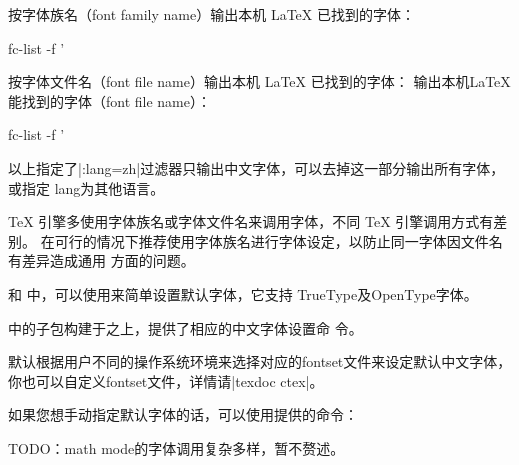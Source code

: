 


按字体族名（font family name）输出本机 \LaTeX{} 已找到的字体：
\begin{shcode}
 fc-list -f '%
\end{shcode}

按字体文件名（font file name）输出本机 \LaTeX{} 已找到的字体：
输出本机LaTeX能找到的字体（font file name）：
\begin{shcode}
 fc-list -f '%
\end{shcode}

以上指定了|:lang=zh|过滤器只输出中文字体，可以去掉这一部分输出所有字体，或指定
lang为其他语言。



\TeX{} 引擎多使用字体族名或字体文件名来调用字体，不同 \TeX{} 引擎调用方式有差别。
在可行的情况下推荐使用字体族名进行字体设定，以防止同一字体因文件名有差异造成通用
方面的问题。

\XeLaTeX{} 和 \LuaLaTeX{} 中，可以使用来简单设置默认字体，它支持
TrueType及OpenType字体。
\begin{texlist}
\setmainfont{Libertinus Serif}
\setsansfont{TeX Gyre Heros}
\setmonofont{Libertinus Mono}
\end{texlist}

中的子包构建于之上，提供了相应的中文字体设置命
令。

默认根据用户不同的操作系统环境来选择对应的fontset文件来设定默认中文字体，
你也可以自定义fontset文件，详情请|texdoc ctex|。

如果您想手动指定默认字体的话，可以使用提供的命令：
\begin{texlist}
\end{texlist}

TODO：math mode的字体调用复杂多样，暂不赘述。


